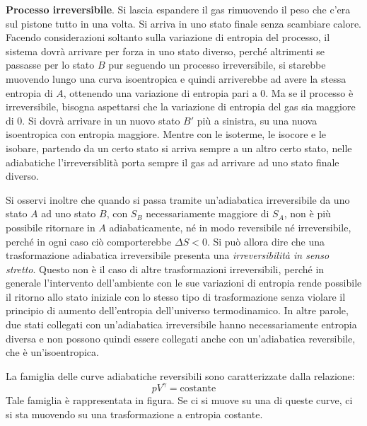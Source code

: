 \documentclass[10pt,a4paper]{book}
\begin{document}
\textbf{Processo irreversibile}. Si lascia espandere il gas rimuovendo il peso che c'era sul pistone tutto in una volta. Si arriva in uno stato finale senza scambiare calore. Facendo considerazioni soltanto sulla variazione di entropia del processo, il sistema dovrà arrivare per forza in uno stato diverso, perché altrimenti se passasse per lo stato $B$ pur seguendo un processo irreversibile, si starebbe muovendo lungo una curva isoentropica e quindi arriverebbe ad avere la stessa entropia di $A$, ottenendo una variazione di entropia pari a $0$. Ma se il processo è irreversibile, bisogna aspettarsi che la variazione di entropia del gas sia maggiore di $0$. Si dovrà arrivare in un nuovo stato $B'$ più a sinistra, su una nuova isoentropica con entropia maggiore. Mentre con le isoterme, le isocore e le isobare, partendo da un certo stato si arriva sempre a un altro certo stato, nelle adiabatiche l'irreversiblità porta sempre il gas ad arrivare ad uno stato finale diverso.

Si osservi inoltre che quando si passa tramite un'adiabatica irreversibile da uno stato $A$ ad uno stato $B$, con $S_B$ necessariamente maggiore di $S_A$, non è più possibile ritornare in $A$ adiabaticamente, né in modo reversibile né irreversibile, perché in ogni caso ciò comporterebbe $\Delta S<0$. Si può allora dire che una trasformazione adiabatica irreversibile presenta una \emph{irreversibilità in senso stretto}. Questo non è il caso di altre trasformazioni irreversibili, perché in generale l'intervento dell'ambiente con le sue variazioni di entropia rende possibile il ritorno allo stato iniziale con lo stesso tipo di trasformazione senza violare il principio di aumento dell'entropia dell'universo termodinamico.
In altre parole, due stati collegati con un'adiabatica irreversibile hanno necessariamente entropia diversa e non possono quindi essere collegati anche con un'adiabatica reversibile, che è un'isoentropica.

La famiglia delle curve adiabatiche reversibili sono caratterizzate dalla relazione:
\[
	pV^{\gamma } = \text{costante}
\]
Tale famiglia è rappresentata in figura. Se ci si muove su una di queste curve, ci si sta muovendo su una trasformazione a entropia costante.
\end{document}
